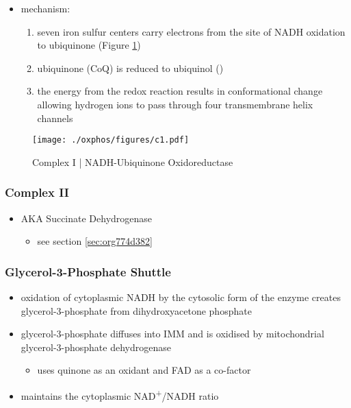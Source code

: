\documentclass[12pt]{scrartcl}
\begin{document}
{\small{}}

\begin{itemize}
\item mechanism: 
\begin{enumerate}
\item seven iron sulfur centers carry electrons from the site of NADH
oxidation to ubiquinone (Figure \ref{fig:orgdba1d9e})
\item ubiquinone (CoQ) is reduced to ubiquinol ()
\item the energy from the redox reaction results in conformational
change allowing hydrogen ions to pass through four transmembrane
helix channels
\end{enumerate}
\end{itemize}

\begin{figure}[htbp]
\centering
\texttt{[image: ./oxphos/figures/c1.pdf]}
\caption[c1]{\label{fig:orgdba1d9e}Complex I | NADH-Ubiquinone Oxidoreductase}
\end{figure}

\subsubsection{Complex II}
\label{sec:org2e94507}
\begin{itemize}
\item AKA Succinate Dehydrogenase 
\begin{itemize}
\item see section \ref{sec:org774d382}
\end{itemize}
\end{itemize}

\subsubsection{Glycerol-3-Phosphate Shuttle}
\label{sec:orgdb6f506}
\begin{itemize}
\item oxidation of cytoplasmic NADH by the cytosolic form of the enzyme
creates glycerol-3-phosphate from dihydroxyacetone phosphate
\item glycerol-3-phosphate diffuses into IMM and is oxidised by mitochondrial glycerol-3-phosphate dehydrogenase
\begin{itemize}
\item uses quinone as an oxidant and FAD as a co-factor
\end{itemize}
\item maintains the cytoplasmic NAD\textsuperscript{+}/NADH ratio
\end{itemize}
\end{document}
